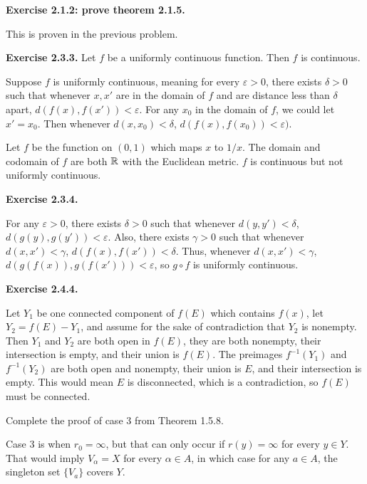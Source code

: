 \documentclass{article}
\begin{document}
\textbf{Exercise 2.1.2: prove theorem 2.1.5.}
\par
{} This is proven in the previous problem.
\par
{}
\par
{}
\par
{}
\bigskip
\par
\textbf{Exercise 2.3.3.} Let $f$ be a uniformly continuous function. Then $f$ is continuous.
\par
Suppose $f$ is uniformly continuous, meaning for every $\varepsilon > 0$, there exists $\delta > 0$ such that whenever $x, x'$ are in the domain of $f$ and are distance less than $\delta$ apart, $d(f(x), f(x')) < \varepsilon$. For any $x_0$ in the domain of $f$, we could let $x' = x_0$. Then whenever $d(x, x_0) < \delta$, $d(f(x), f(x_0)) < \varepsilon)$.
\par
Let $f$ be the function on $(0, 1)$ which maps $x$ to $1/x$. The domain and codomain of $f$ are both $\mathbb{R}$ with the Euclidean metric. $f$ is continuous but not uniformly continuous.
\par
\bigskip
\par
\textbf{Exercise 2.3.4.}
\par
For any $\varepsilon > 0$, there exists $\delta > 0$ such that whenever $d(y, y') < \delta$, $d(g(y), g(y')) < \varepsilon$. Also, there exists $\gamma > 0$ such that whenever $d(x, x') < \gamma$, $d(f(x), f(x')) < \delta$. Thus, whenever $d(x, x') < \gamma$, $d(g(f(x)), g(f(x'))) < \varepsilon$, so $g \circ f$ is uniformly continuous.
\bigskip
\par
\textbf{Exercise 2.4.4.}
\par
Let $Y_1$ be one connected component of $f(E)$ which contains $f(x)$, let $Y_2 = f(E) - Y_1$, and assume for the sake of contradiction that $Y_2$ is nonempty. Then $Y_1$ and $Y_2$ are both open in $f(E)$, they are both nonempty, their intersection is empty, and their union is $f(E)$. The preimages $f^{-1}(Y_1)$ and $f^{-1}(Y_2)$ are both open and nonempty, their union is $E$, and their intersection is empty. This would mean $E$ is disconnected, which is a contradiction, so $f(E)$ must be connected.

\bigskip
\begin{prob}
    Complete the proof of case 3 from Theorem 1.5.8.
\end{prob}
Case 3 is when $r_0=\infty$, but that can only occur if $r(y)=\infty$ for every $y \in Y$. That would imply $V_\alpha = X$ for every $\alpha \in A$, in which case for any $a \in A$, the singleton set $\{V_a\}$ covers $Y$.
\end{document}
